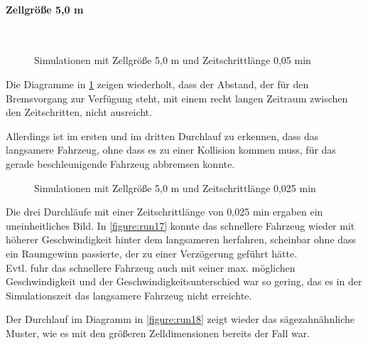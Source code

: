 \paragraph*{Zellgröße 5,0 m}
\hfill \\

\begin{figure}[hptb]
  \centering 
   \qquad 
   \qquad 
  \caption{Simulationen mit Zellgröße 5,0 m und Zeitschrittlänge 0,05 min} 
  \label{figure:run14-16}
\end{figure}

Die Diagramme in \cref{figure:run14-16} zeigen wiederholt, dass der Abstand, der für den Bremsvorgang zur Verfügung steht, mit einem recht langen Zeitraum zwischen den Zeitschritten, nicht ausreicht.

Allerdings ist im ersten und im dritten Durchlauf zu erkennen, dass das langsamere Fahrzeug, ohne dass es zu einer Kollision kommen muss, für das gerade beschleunigende Fahrzeug abbremsen konnte. 

\begin{figure}[hptb]
  \centering 
   \qquad 
   \qquad 
  \caption{Simulationen mit Zellgröße 5,0 m und Zeitschrittlänge 0,025 min} 
  \label{figure:run17-19}
\end{figure}

Die drei Durchläufe mit einer Zeitschrittlänge von 0,025 min ergaben ein uneinheitliches Bild.
In \cref{figure:run17} konnte das schnellere Fahrzeug wieder mit höherer Geschwindigkeit hinter dem langsameren herfahren, scheinbar ohne dass ein Raumgewinn passierte, der zu einer Verzögerung geführt hätte.
\\
Evtl. fuhr das schnellere Fahrzeug auch mit seiner max. möglichen Geschwindigkeit und der Geschwindigkeitsunterschied war so gering, das es in der Simulationszeit das langsamere Fahrzeug nicht erreichte.

Der Durchlauf im Diagramm in \cref{figure:run18} zeigt wieder das sägezahnähnliche Muster, wie es mit den größeren Zelldimensionen bereits der Fall war.

